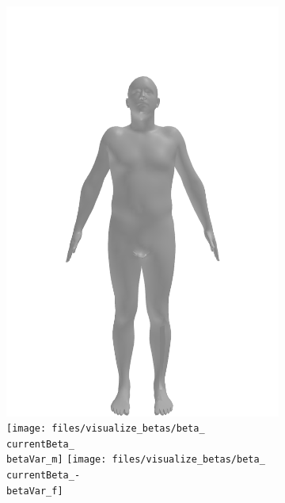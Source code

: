 \begin{figure}[ht!]
\begin{subfigure}{\betaWidth}
        \includegraphics[width=\imgWidth]{files/visualize_betas/baseline_m}
        \texttt{[image: files/visualize\_betas/beta\_\\currentBeta\_\\betaVar\_m]}
        \linebreak
        \texttt{[image: files/visualize\_betas/beta\_\\currentBeta\_-\\betaVar\_f]}

\end{subfigure}
\end{figure}
